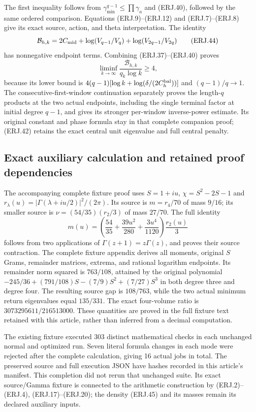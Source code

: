 The first inequality follows from
$\gamma_{\min}^{q-1}\le\prod\gamma_a$ and (ERJ.40), followed
by the same ordered comparison. Equations (ERJ.9)--(ERJ.12) and
(ERJ.7)--(ERJ.8) give its exact source, action, and theta interpretation.
The identity
\[
 \mathcal B_{h,k}=2C_{\rm mid}
 +\log(V_{q-1}/V_q)+\log(V_{2q-1}/V_{2q})\tag{ERJ.44}
\]
has nonnegative endpoint terms. Combining (ERJ.37)--(ERJ.40) proves
\[
 \liminf_{k\to\infty}\frac{\mathcal B_{h,k}}{q_k\log k}\ge4,
\]
because its lower bound is
$4(q-1)[\log k+\log(\delta/(2C_h^{\rm bal}))]$ and
$(q-1)/q\to1$. The consecutive-first-window continuation separately
proves the length-$q$ products at the two actual endpoints, including
the single terminal factor at initial degree $q-1$, and gives its
stronger per-window inverse-power estimate. Its original constant and
phase formula stay in that complete companion proof; (ERJ.42) retains
the exact central unit eigenvalue and full central penalty.

\subsection{Exact auxiliary calculation and retained proof dependencies}
The accompanying complete fixture proof uses $S=1+iu$,
$\chi=S^2-2S-1$ and
$r_\lambda(u)=|\Gamma(\lambda+iu/2)|^2/(2\pi)$.
Its source is $m=r_4/70$ of mass $9/16$; its smaller source is
$\nu=(54/35)(r_2/3)$ of mass $27/70$. The full identity
\[
 m(u)=\left(\frac{54}{35}+\frac{39u^2}{280}
                  +\frac{3u^4}{1120}\right)\frac{r_2(u)}3
 \tag{ERJ.45}
\]
follows from two applications of $\Gamma(z+1)=z\Gamma(z)$,
and proves their source contraction. The complete fixture appendix
derives all moments, original $S$ Grams, remainder matrices, extrema,
and rational logarithm endpoints. Its remainder norm squared is
$763/108$, attained by the original polynomial
$-245/36+(791/108)S-(7/9)S^2+(7/27)S^3$ in both degree three
and degree four. The resulting source gap is $108/763$, while
the two actual minimum return eigenvalues equal $135/331$.
The exact four-volume ratio is $3073295611/216513000$.
These quantities are proved in the full fixture text retained with
this article, rather than inferred from a decimal computation.

The existing fixture executed 303 distinct mathematical checks in
each unchanged normal and optimized run. Seven literal formula changes
in each mode were rejected after the complete calculation, giving
16 actual jobs in total. The preserved source and full execution JSON
have hashes recorded in this article's manifest. This completion did
not rerun that unchanged suite. Its exact source/Gamma fixture is
connected to the arithmetic construction by (ERJ.2)--(ERJ.4),
(ERJ.17)--(ERJ.20); the density (ERJ.45) and its masses remain its
declared auxiliary inputs.

